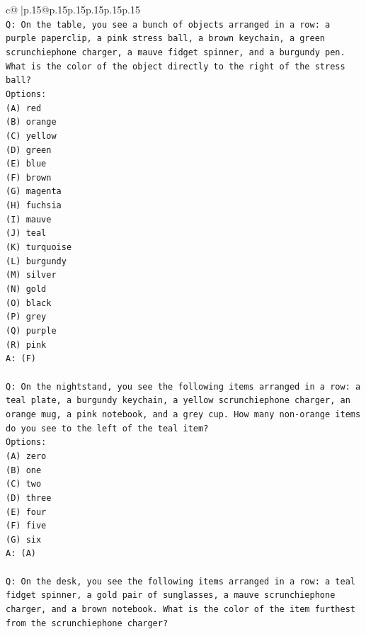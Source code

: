 \documentclass{article}
\begin{document}
{\begin{supertabular}{c@{$\;$}|p{.15\linewidth}@{}p{.15\linewidth}p{.15\linewidth}p{.15\linewidth}p{.15\linewidth}p{.15\linewidth}}
{{{\\ 
\texttt{Q: On the table, you see a bunch of objects arranged in a row: a purple paperclip, a pink stress ball, a brown keychain, a green scrunchiephone charger, a mauve fidget spinner, and a burgundy pen. What is the color of the object directly to the right of the stress ball?} \\
\texttt{Options:} \\
\texttt{(A) red} \\
\texttt{(B) orange} \\
\texttt{(C) yellow} \\
\texttt{(D) green} \\
\texttt{(E) blue} \\
\texttt{(F) brown} \\
\texttt{(G) magenta} \\
\texttt{(H) fuchsia} \\
\texttt{(I) mauve} \\
\texttt{(J) teal} \\
\texttt{(K) turquoise} \\
\texttt{(L) burgundy} \\
\texttt{(M) silver} \\
\texttt{(N) gold} \\
\texttt{(O) black} \\
\texttt{(P) grey} \\
\texttt{(Q) purple} \\
\texttt{(R) pink} \\
\texttt{A: (F)} \\
\\ 
\texttt{Q: On the nightstand, you see the following items arranged in a row: a teal plate, a burgundy keychain, a yellow scrunchiephone charger, an orange mug, a pink notebook, and a grey cup. How many non{-}orange items do you see to the left of the teal item?} \\
\texttt{Options:} \\
\texttt{(A) zero} \\
\texttt{(B) one} \\
\texttt{(C) two} \\
\texttt{(D) three} \\
\texttt{(E) four} \\
\texttt{(F) five} \\
\texttt{(G) six} \\
\texttt{A: (A)} \\
\\ 
\texttt{Q: On the desk, you see the following items arranged in a row: a teal fidget spinner, a gold pair of sunglasses, a mauve scrunchiephone charger, and a brown notebook. What is the color of the item furthest from the scrunchiephone charger?} \\
}}}
\end{supertabular}}
\end{document}
